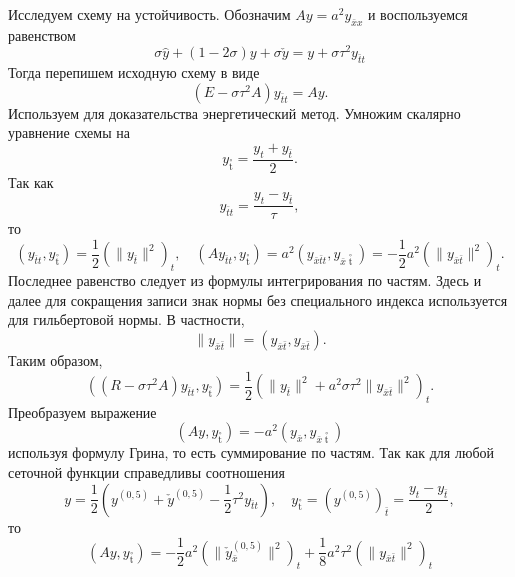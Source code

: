 \documentclass[12pt, a4paper]{article}
\newcommand{\widecheck}[1]{\check{#1}}
\newcommand{\down}[1]{\widecheck{#1}}
\newcommand{\pon}[1]{\mathop {#1}\limits^ \circ}
\begin{document}
	Исследуем схему на устойчивость. Обозначим $Ay = a^2 y_{\bar{x}x}$ и воспользуемся равенством
	\begin{equation*}
		\sigma \hat{y} + (1 - 2 \sigma) y + \sigma \widecheck{y} = y + \sigma \tau^2 y_{\bar{t}t}
	\end{equation*}
	Тогда перепишем исходную схему в виде
	\begin{equation*}
		(E - \sigma \tau^2 A)y_{\bar{t}t} = Ay.
	\end{equation*}
	Используем для доказательства энергетический метод. Умножим скалярно уравнение схемы на 
	\begin{equation*}
		y_{\pon{t}} = \frac{y_t + y_{\bar{t}}}{2}. 
	\end{equation*}
	Так как 
	\begin{equation*}
		y_{\bar{t}t} = \frac{y_t - y_{\bar{t}}}{\tau},
	\end{equation*}
	то 
	\begin{equation*}
		(y_{\bar{t}t}, y_{\pon{t}}) = \frac{1}{2} (\parallel y_{\bar{t}} \parallel^2)_t, \quad (A y_{\bar{t}t}, y_{\pon{t}}) = a^2 (y_{\bar{x} \bar{t} t}, y_{\bar{x} \pon{t}}) = - \frac{1}{2} a^2 (\parallel y_{\bar{x} \bar{t}} \parallel^2)_t.
	\end{equation*}
	Последнее равенство следует из формулы интегрирования по частям. Здесь и далее для сокращения записи знак нормы без специального индекса используется для гильбертовой нормы. В частности,
	\begin{equation*}
		\parallel y_{\bar{x} \bar{t}} \parallel = ( y_{\bar{x} \bar{t}},  y_{\bar{x} \bar{t}}).
	\end{equation*}
	 Таким образом, 
	 \begin{equation*}
	 	((R - \sigma \tau^2 A) y_{\bar{t}t}, y_{\pon{t}}) = \frac{1}{2} (\parallel y_{\bar{t}} \parallel^2 + a^2 \sigma \tau^2 \parallel y_{\bar{x}\bar{t}} \parallel^2)_t.
	\end{equation*}
	Преобразуем выражение 
	\begin{equation*}
		(Ay, y_{\pon{t}}) = -a^2 (y_{\bar{x}}, y_{\bar{x} \pon{t}})
	\end{equation*}
	используя формулу Грина, то есть суммирование по частям. Так как для любой сеточной функции справедливы соотношения
	\begin{equation*}
		y = \frac{1}{2} (y^{(0, 5)} +  \down{y}^{(0, 5)} - \frac{1}{2} \tau^2 y_{\bar{t}t}), \quad y_{\pon{t}} = (y^{(0, 5)})_{\bar{t}} = \frac{y_t - y_{\bar{t}}}{2},
	\end{equation*}
	то
	\begin{equation*}
		(Ay, y_{\pon{t}}) = -\frac{1}{2} a^2 (\parallel \down{y}^{(0,5)}_{\bar{x}}\parallel^2)_t + \frac{1}{8} a^2 \tau^2 (\parallel y_{\bar{x}\bar{t}}\parallel^2)_t
	\end{equation*}
\end{document}

